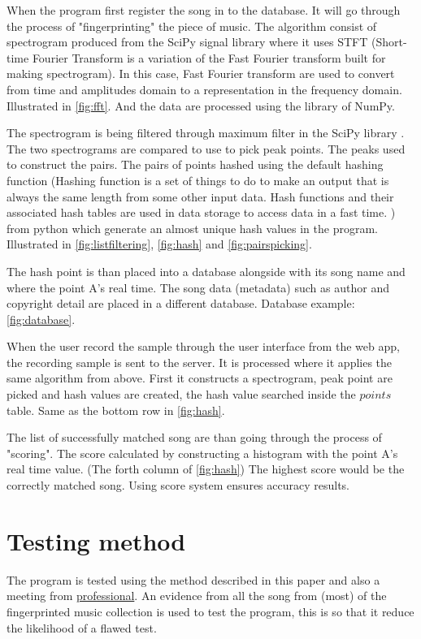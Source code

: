 When the program first register the song in to the database. It will go through the process of "fingerprinting" the piece of music. The algorithm consist of spectrogram produced from the SciPy signal library \cite{virtanen_scipy_2020} where it uses STFT (Short-time Fourier Transform is a variation of the Fast Fourier transform built for making spectrogram). In this case, Fast Fourier transform are used to convert from time and amplitudes domain to a representation in the frequency domain. Illustrated in \autoref{fig:fft}. \cite{noauthor_fast_2025} And the data are processed using the library of NumPy. \cite{harris_array_2020}

The spectrogram is being filtered through maximum filter in the SciPy library \cite{virtanen_scipy_2020}. The two spectrograms are compared to use to pick peak points. The peaks used to construct the pairs.  The pairs of points hashed using the default hashing function (Hashing function is a set of things to do to make an output that is always the same length from some other input data. Hash functions and their associated hash tables are used in data storage to access data in a fast time. \cite{noauthor_hash_2024}) from python which generate an almost unique hash values in the program.  Illustrated in \autoref{fig:listfiltering}, \autoref{fig:hash} and \autoref{fig:pairspicking}.

The hash point is than placed into a database alongside with its song name and where the point A's real time. The song data (metadata) such as author and copyright detail are placed in a different database. Database example: \autoref{fig:database}.

When the user record the sample through the user interface from the web app, the recording sample is sent to the server. It is processed where it applies the same algorithm from above. First it constructs a spectrogram, peak point are picked and hash values are created, the hash value searched inside the $points$ table. Same as the bottom row in \autoref{fig:hash}.

The list of successfully matched song are than going through the process of "scoring". The score calculated by constructing a histogram with the point A's real time value. (The forth column of \autoref{fig:hash}) The highest score would be the correctly matched song. Using score system ensures accuracy results. \cite{wang_systems_2013,macleod_abracadabra_nodate,yang_music_2001,wang_industrial-strength_2003}
\chapter{Testing method}
The program is tested using the method described in this paper \cite{yang_music_2001} and also a meeting from \hyperref[meeting:2]{professional}. An evidence from all the song from (most) of the fingerprinted music collection is used to test the program, this is so that it reduce the likelihood of a flawed test. 

